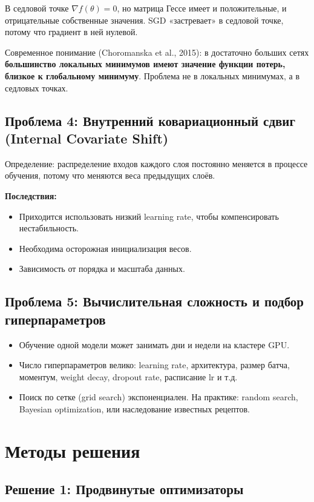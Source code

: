 \documentclass[a4paper,12pt]{article}
\begin{document}
В седловой точке $\nabla f(\theta) = 0$, но матрица Гессе имеет и положительные, и отрицательные собственные значения. SGD «застревает» в седловой точке, потому что градиент в ней нулевой.

Современное понимание (Choromanska et al., 2015): в достаточно больших сетях \textbf{большинство локальных минимумов имеют значение функции потерь, близкое к глобальному минимуму}. Проблема не в локальных минимумах, а в седловых точках.

\subsection{Проблема 4: Внутренний ковариационный сдвиг (Internal Covariate Shift)}

Определение: распределение входов каждого слоя постоянно меняется в процессе обучения, потому что меняются веса предыдущих слоёв.

\textbf{Последствия:}
\begin{itemize}
    \item Приходится использовать низкий learning rate, чтобы компенсировать нестабильность.
    \item Необходима осторожная инициализация весов.
    \item Зависимость от порядка и масштаба данных.
\end{itemize}

\subsection{Проблема 5: Вычислительная сложность и подбор гиперпараметров}

\begin{itemize}
    \item Обучение одной модели может занимать дни и недели на кластере GPU.
    \item Число гиперпараметров велико: learning rate, архитектура, размер батча, моментум, weight decay, dropout rate, расписание lr и т.д.
    \item Поиск по сетке (grid search) экспоненциален. На практике: random search, Bayesian optimization, или наследование известных рецептов.
\end{itemize}

\section{Методы решения}

\subsection{Решение 1: Продвинутые оптимизаторы}
\end{document}
